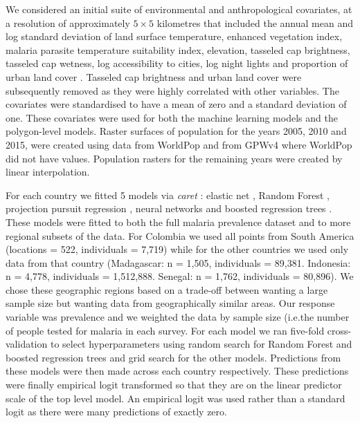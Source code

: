 \documentclass[11pt]{article}
\begin{document}
We considered an initial suite of environmental and anthropological covariates, at a resolution of approximately $5 \times 5$ kilometres that included the annual mean and log standard deviation of land surface temperature, enhanced vegetation index, malaria parasite temperature suitability index, elevation, tasseled cap brightness, tasseled cap wetness, log accessibility to cities, log night lights and proportion of urban land cover \citep{weiss2015re, weiss2018global}. 
Tasseled cap brightness and urban land cover were subsequently removed as they were highly correlated with other variables. 
The covariates were standardised to have a mean of zero and a standard deviation of one. 
These covariates were used for both the machine learning models and the polygon-level models.
Raster surfaces of population for the years 2005, 2010 and 2015, were created using data from WorldPop \citep{tatem2017worldpop} and from GPWv4 \citep{gpw4} where WorldPop did not have values. 
Population rasters for the remaining years were created by linear interpolation. 


For each country we fitted 5 models via \emph{caret} \citep{caret}: elastic net \citep{enet}, Random Forest \citep{wright2015ranger}, projection pursuit regression \citep{friedman1981projection}, neural networks \citep{nnet} and boosted regression trees \citep{gbm}.
These models were fitted to both the full malaria prevalence dataset and to more regional subsets of the data.
For Colombia we used all points from South America (locations = 522, individuals = 7,719) while for the other countries we used only data from that country (Madagascar: n = 1,505, individuals = 89,381. Indonesia: n = 4,778, individuals = 1,512,888. Senegal: n = 1,762, individuals = 80,896).
We chose these geographic regions based on a trade-off between wanting a large sample size but wanting data from geographically similar areas.
Our response variable was prevalence and we weighted the data by sample size (i.e.\thinspace the number of people tested for malaria in each survey.
For each model we ran  five-fold cross-validation to select hyperparameters using random search for Random Forest and boosted regression trees and grid search for the other models. 
Predictions from these models were then made across each country respectively.
These predictions were finally empirical logit transformed so that they are on the linear predictor scale of the top level model.
An empirical logit was used rather than a standard logit as there were many predictions of exactly zero.
\end{document}
